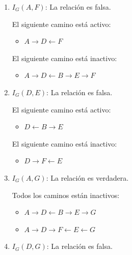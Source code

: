 \documentclass[12pt,a4paper]{article}
\begin{document}
\begin{enumerate}
\begin{enumerate}
        \item $I_G(A, F)$: \; La relación es falsa.
        
        \begin{multicols}{2}
            El siguiente camino está activo:
            \begin{itemize}
                \item $A \to D \leftarrow F$
            \end{itemize}

            El siguiente camino está inactivo:
            \begin{itemize}
                \item $A \to D \leftarrow B \to E \to F$
            \end{itemize}
        \end{multicols}

        \item $I_G(D, E)$: \; La relación es falsa.
        
        \begin{multicols}{2}
            El siguiente camino está activo:
            \begin{itemize}
                \item $D \leftarrow B \to E$
            \end{itemize}

            El siguiente camino está inactivo:
            \begin{itemize}
                \item $D \to F \leftarrow E$
            \end{itemize}
        \end{multicols}

        \item $I_G(A, G)$: \; La relación es verdadera.
        
        Todos los caminos están inactivos:
        \begin{multicols}{2}
            \begin{itemize}
                \item $A \to D \leftarrow B \to E \to G$
                \item $A \to D \to F \leftarrow E \leftarrow G$
            \end{itemize}
        \end{multicols}

        \item $I_G(D, G)$: \; La relación es falsa.
        

\end{enumerate}
\end{enumerate}
\end{document}
